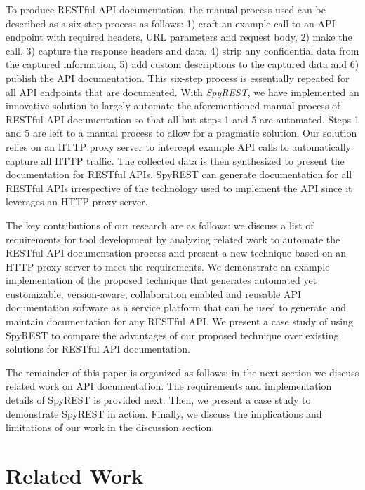 To produce RESTful API documentation, the manual process used can be described as a six-step process as follows: 1) craft an example call to an API endpoint with required headers, URL parameters and request body, 2) make the call, 3) capture the response headers and data, 4) strip any confidential data from the captured information, 5) add custom descriptions to the captured data and 6) publish the API documentation. This six-step process is essentially repeated for all API endpoints that are documented. With \emph{SpyREST}, we have implemented an innovative solution to largely automate the aforementioned manual process of RESTful API documentation so that all but steps 1 and 5 are automated. Steps 1 and 5 are left to a manual process to allow for a pragmatic solution. Our solution relies on an HTTP proxy server to intercept example API calls to automatically capture all HTTP traffic. The collected data is then synthesized to present the documentation for RESTful APIs. SpyREST can generate documentation for all RESTful APIs irrespective of the technology used to implement the API since it leverages an HTTP proxy server.

The key contributions of our research are as follows: we discuss a list of requirements for tool development by analyzing related work to automate the RESTful API documentation process and present a new technique based on an HTTP proxy server to meet the requirements. We demonstrate an example implementation of the proposed technique that generates automated yet customizable, version-aware, collaboration enabled and reusable API documentation software as a service platform that can be used to generate and maintain documentation for any RESTful API. We present a case study of using SpyREST to compare the advantages of our proposed technique over existing solutions for RESTful API documentation.

The remainder of this paper is organized as follows: in the next section we discuss related work on API documentation. The requirements and implementation details of SpyREST is provided next. Then, we present a case study to demonstrate SpyREST in action. Finally, we discuss the implications and limitations of our work in the discussion section.


\section{Related Work} %
\label{sec:related_work}

